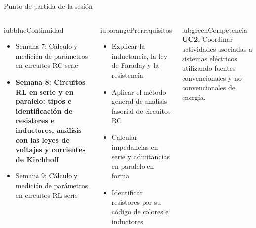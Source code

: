 \documentclass[aspectratio=169,11pt,xcolor={table}]{beamer}
\begin{document}
\begin{frame}{Punto de partida de la sesión}
\begin{columns}[T,onlytextwidth]
\begin{caja}[height=5.9cm]{iubblue}{Continuidad}
\scriptsize \begin{itemize}\setlength{\itemsep}{2pt}
  \item Semana 7: Cálculo y medición de parámetros en circuitos RC serie
  \item \textbf{Semana 8: Circuitos RL en serie y en paralelo: tipos e identificación de resistores e inductores, análisis con las leyes de voltajes y corrientes de Kirchhoff}
  \item Semana 9: Cálculo y medición de parámetros en circuitos RL serie
\end{itemize}
\end{caja}
\begin{caja}[height=5.9cm]{iuborange}{Prerrequisitos}
\scriptsize \begin{itemize}\setlength{\itemsep}{2pt}
  \item Explicar la inductancia, la ley de Faraday y la resistencia
  \item Aplicar el método general de análisis fasorial de circuitos RC
  \item Calcular impedancias en serie y admitancias en paralelo en forma
  \item Identificar resistores por su código de colores e inductores
\end{itemize}
\end{caja}
\begin{caja}[height=5.9cm]{iubgreen}{Competencia}
\scriptsize \textbf{UC2.} Coordinar actividades asociadas a sistemas eléctricos utilizando fuentes convencionales y no convencionales de energía.
\end{caja}
\end{columns}
\end{frame}
\end{document}
